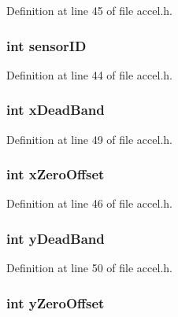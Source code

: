 Definition at line 45 of file accel.h.

\hypertarget{struct_a_c_c_e_l_a4f5a5e2cb7ee061dd0bd29b7086d89ac}{
\subsubsection[{sensorID}]{\setlength{\rightskip}{0pt plus 5cm}int {\bf sensorID}}}
\label{struct_a_c_c_e_l_a4f5a5e2cb7ee061dd0bd29b7086d89ac}


Definition at line 44 of file accel.h.

\hypertarget{struct_a_c_c_e_l_a3cefebaa99c11bd1a016a8c062bcc362}{
\subsubsection[{xDeadBand}]{\setlength{\rightskip}{0pt plus 5cm}int {\bf xDeadBand}}}
\label{struct_a_c_c_e_l_a3cefebaa99c11bd1a016a8c062bcc362}


Definition at line 49 of file accel.h.

\hypertarget{struct_a_c_c_e_l_afe176df047a663a3c9d03a682eb49325}{
\subsubsection[{xZeroOffset}]{\setlength{\rightskip}{0pt plus 5cm}int {\bf xZeroOffset}}}
\label{struct_a_c_c_e_l_afe176df047a663a3c9d03a682eb49325}


Definition at line 46 of file accel.h.

\hypertarget{struct_a_c_c_e_l_a02e257557b0fc42513605236fa8334fb}{
\subsubsection[{yDeadBand}]{\setlength{\rightskip}{0pt plus 5cm}int {\bf yDeadBand}}}
\label{struct_a_c_c_e_l_a02e257557b0fc42513605236fa8334fb}


Definition at line 50 of file accel.h.

\hypertarget{struct_a_c_c_e_l_afac1c21e2382537c1255c0e6e42c4770}{
\subsubsection[{yZeroOffset}]{\setlength{\rightskip}{0pt plus 5cm}int {\bf yZeroOffset}}}
\label{struct_a_c_c_e_l_afac1c21e2382537c1255c0e6e42c4770}


